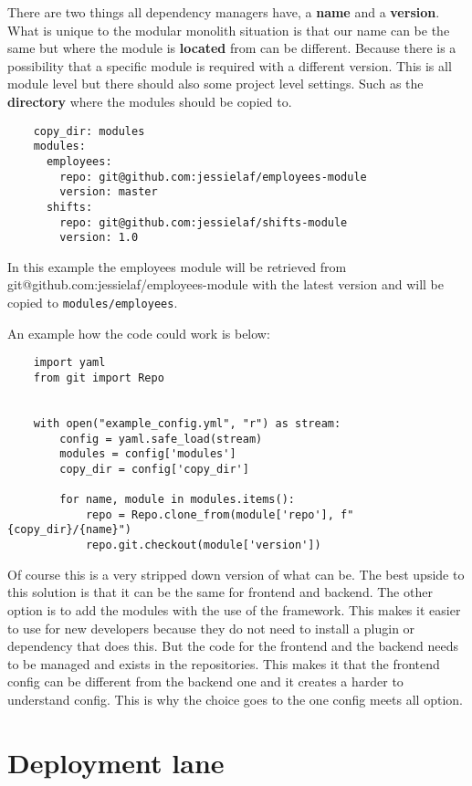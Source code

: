 There are two things all dependency managers have, a \textbf{name} and a \textbf{version}. What is unique to the modular monolith situation is that our name can be the same but where the module is \textbf{located} from can be different. Because there is a possibility that a specific module is required with a different version. This is all module level but there should also some project level settings. Such as the \textbf{directory} where the modules should be copied to.

\begin{verbatim}
    copy_dir: modules
    modules:
      employees:
        repo: git@github.com:jessielaf/employees-module
        version: master
      shifts:
        repo: git@github.com:jessielaf/shifts-module
        version: 1.0
\end{verbatim}

In this example the employees module will be retrieved from git@github.com:jessielaf/employees-module with the latest version and will be copied to \texttt{modules/employees}.

An example how the code could work is below:
\begin{verbatim}
    import yaml
    from git import Repo


    with open("example_config.yml", "r") as stream:
        config = yaml.safe_load(stream)
        modules = config['modules']
        copy_dir = config['copy_dir']

        for name, module in modules.items():
            repo = Repo.clone_from(module['repo'], f"{copy_dir}/{name}")
            repo.git.checkout(module['version'])
\end{verbatim}

Of course this is a very stripped down version of what can be. The best upside to this solution is that it can be the same for frontend and backend. The other option is to add the modules with the use of the framework. This makes it easier to use for new developers because they do not need to install a plugin or dependency that does this. But the code for the frontend and the backend needs to be managed and exists in the repositories. This makes it that the frontend config can be different from the backend one and it creates a harder to understand config. This is why the choice goes to the one config meets all option.

\section{Deployment lane}

